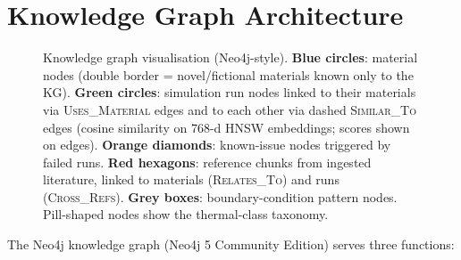 \documentclass[twocolumn]{article}
\begin{document}
\section{Knowledge Graph Architecture}
\label{sec:kg}

\begin{figure}[htbp]
  \centering
  \resizebox{0.85\textwidth}{!}{}
  \caption{Knowledge graph visualisation (Neo4j-style).
    \textbf{Blue circles}: material nodes (double border = novel/fictional
    materials known only to the KG).
    \textbf{Green circles}: simulation run nodes linked to their materials
    via \textsc{Uses\_Material} edges and to each other via dashed
    \textsc{Similar\_To} edges (cosine similarity on 768-d HNSW embeddings;
    scores shown on edges).
    \textbf{Orange diamonds}: known-issue nodes triggered by failed runs.
    \textbf{Red hexagons}: reference chunks from ingested literature,
    linked to materials (\textsc{Relates\_To}) and runs (\textsc{Cross\_Refs}).
    \textbf{Grey boxes}: boundary-condition pattern nodes.
    Pill-shaped nodes show the thermal-class taxonomy.}
  \label{fig:kg}
\end{figure}

The Neo4j knowledge graph \citep{francis2018neo4j} (Neo4j 5 Community
Edition) serves three functions:
\end{document}
